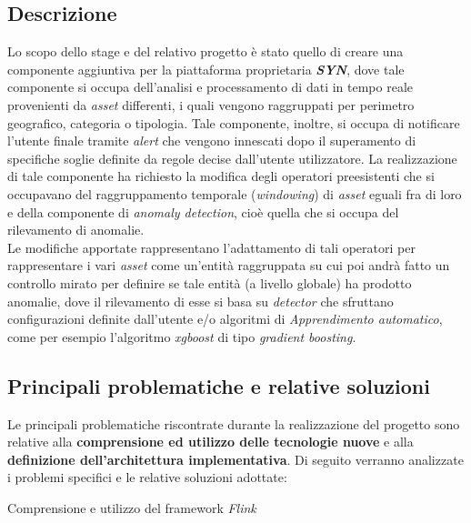 \subsection{Descrizione}

Lo scopo dello stage e del relativo progetto è stato quello di creare una componente aggiuntiva per la piattaforma proprietaria \textbf{\textit{SYN}}, dove tale componente si occupa dell'analisi e processamento di dati in tempo reale provenienti da \textit{asset} differenti, i quali vengono raggruppati per perimetro geografico, categoria o tipologia. Tale componente, inoltre,
si occupa di notificare l'utente finale tramite \textit{alert} che vengono innescati dopo il superamento di specifiche soglie definite da regole decise dall'utente utilizzatore.
La realizzazione di tale componente ha richiesto la modifica degli operatori preesistenti che si occupavano del raggruppamento temporale (\textit{windowing}) di \textit{asset} eguali fra di loro e della componente di \textit{anomaly detection}, cioè quella che si occupa del rilevamento di anomalie.\\
Le modifiche apportate rappresentano l'adattamento di tali operatori per rappresentare i vari \textit{asset} come un'entità raggruppata su cui poi andrà fatto un controllo mirato per definire se tale entità (a livello globale) ha prodotto anomalie, dove il rilevamento di esse si basa su \textit{detector} che sfruttano configurazioni definite dall'utente e/o algoritmi di \textit{\gls{Apprendimento automatico}}, come per esempio l'algoritmo \textit{\gls{xgboost}} di tipo \textit{\gls{gradient boosting}}.


\subsection{Principali problematiche e relative soluzioni}
Le principali problematiche riscontrate durante la realizzazione del progetto sono relative alla \textbf{comprensione ed utilizzo delle tecnologie nuove} e alla \textbf{definizione dell'architettura implementativa}. Di seguito verranno analizzate i problemi specifici e le relative soluzioni adottate:\\

\begin{risk}{Comprensione e utilizzo del framework \textit{Flink}}
    \label{risk:flinkImport}
\end{risk}

